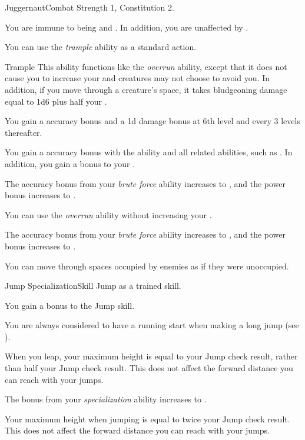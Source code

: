     \begin{feat}{Juggernaut}{Combat}
        \featpre Strength 1, Constitution 2.

         You are immune to being \slowed and \immobilized.
        In addition, you are unaffected by .

         You can use the \textit{trample} ability as a standard action.
        \begin{ability}{Trample}
            This ability functions like the \textit{overrun} ability, except that it does not cause you to increase your  and creatures may not choose to avoid you.
            In addition, if you move through a creature's space, it takes bludgeoning damage equal to 1d6 plus half your .

            \rankline
            You gain a  accuracy bonus and a \plus1d damage bonus at 6th level and every 3 levels thereafter.
        \end{ability}

         You gain a  accuracy bonus with the  ability and all related abilities, such as .
        In addition, you gain a  bonus to your .

         The accuracy bonus from your \textit{brute force} ability increases to , and the power bonus increases to .

         You can use the \textit{overrun} ability without increasing your .

         The accuracy bonus from your \textit{brute force} ability increases to , and the power bonus increases to .

         You can move through spaces occupied by enemies as if they were unoccupied.
    \end{feat}

    \begin{feat}{Jump Specialization}{Skill}
        \featpre Jump as a trained skill.

         You gain a  bonus to the Jump skill.

         You are always considered to have a running start when making a long jump (see ).

         When you leap, your maximum height is equal to your Jump check result, rather than half your Jump check result.
        This does not affect the forward distance you can reach with your jumps.

         The bonus from your \textit{specialization} ability increases to .

         Your maximum height when jumping is equal to twice your Jump check result.
        This does not affect the forward distance you can reach with your jumps.
    \end{feat}

